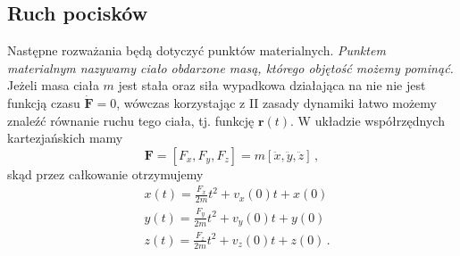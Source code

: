 \documentclass[../main.tex]{subfiles}
\begin{document}
\subsection{Ruch pocisków}
Następne rozważania będą dotyczyć punktów materialnych. \textit{Punktem materialnym nazywamy ciało obdarzone masą, którego objętość możemy pominąć.} Jeżeli masa ciała \(m\) jest stała oraz siła wypadkowa działająca na nie nie jest funkcją czasu \(\dot{\mathbf{F}}=0\), wówczas korzystając z II zasady dynamiki łatwo możemy znaleźć równanie ruchu tego ciała, tj. funkcję \(\mathbf{r}(t)\). W układzie współrzędnych kartezjańskich mamy
\begin{equation*}
    \mathbf{F}=[F_x,F_y,F_z]=m[\ddot x,\ddot y, \ddot z]\,,
\end{equation*}
skąd przez całkowanie otrzymujemy
\begin{equation*}
    \begin{split}
    &x(t)=\frac{F_x}{2m}t^2+v_x(0)t+x(0)\\
    &y(t)=\frac{F_y}{2m}t^2+v_y(0)t+y(0)\\
    &z(t)=\frac{F_z}{2m}t^2+v_z(0)t+z(0)\,.
    \end{split}
\end{equation*}
\end{document}
